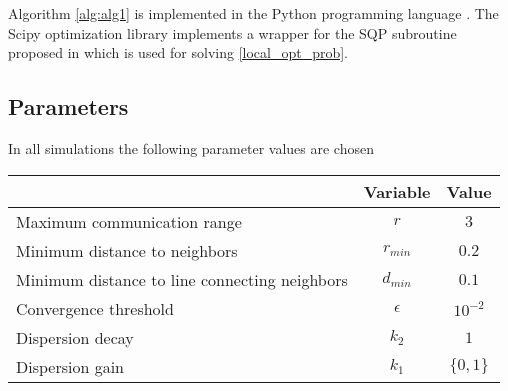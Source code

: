 Algorithm \ref{alg:alg1} is implemented in the Python programming language \cite{python}. The Scipy \cite{2020SciPy-NMeth} optimization library implements a wrapper
for the SQP subroutine proposed in \cite{kraft1988software} which is used for solving \eqref{local_opt_prob}.
\subsection{Parameters}
In all simulations the following parameter values are chosen
\begin{center}
  \begin{tabular}{l|c|c}
     & Variable & Value\\
    \hline
    Maximum communication range & $r$ & $3$\\
    Minimum distance to neighbors & $r_{min}$ & $0.2$\\
    Minimum distance to line connecting neighbors & $d_{min}$ & $0.1$\\
    Convergence threshold & $\epsilon$ & $10^{-2}$\\
    Dispersion decay & $k_{2}$ & $1$\\
    Dispersion gain & $k_{1}$ & $\{0, 1\}$
  \end{tabular}
\end{center}